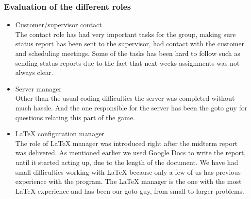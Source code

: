 \subsubsection{Evaluation of the different roles}
\begin{itemize} \setlength{\itemsep}{0cm}\setlength{\parskip}{0cm}
	\item Customer/supervisor contact \\
	The contact role has had very important tasks for the group, making sure status report has been sent to the supervisor,  had contact with the customer and scheduling meetings. Some of the tasks has been hard to follow such as sending status reports due to the fact that next weeks assignments was not always clear. 
	\item Server manager\\
Other than the usual coding difficulties the server was completed without much hassle. And the one responsible for the server has been the goto guy for questions relating this part of the game.
	\item LaTeX configuration manager\\
The role of LaTeX manager was introduced right after the midterm report was delivered. As mentioned earlier we used Google Docs to write the report, until it started acting up, due to the length of the document. We have had small difficulties working with LaTeX because only a few of us has previous experience with the program. The LaTeX manager is the one with the most LaTeX experience and has been our goto guy, from small to larger problems.


\end{itemize}
